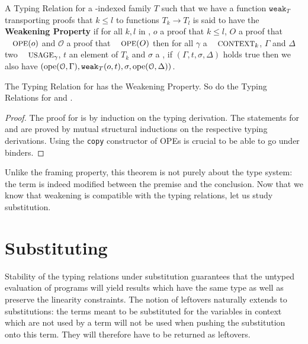 \begin{definition}A Typing Relation \TR{\cdot} for a \Nat{}-indexed family $T$
such that we have a function $\texttt{weak}_T$ transporting proofs that
\ensuremath{k \leq l} to functions \ensuremath{T_k \rightarrow T_l} is said to have the \textbf{Weakening Property}
if for all $k, l$ in \Nat{}, $o$ a proof that \ensuremath{k \leq l}, $O$ a proof that
$\OPE{}(o)$ and $\ensuremath{\mathcal{O}}$ a proof that $\OPE{}(O)$ then for all \ensuremath{\gamma} a $\Context{k}$,
\ensuremath{\Gamma} and \ensuremath{\Delta} two $\Usages{\ensuremath{\gamma}}$, $t$ an element of $T_k$ and \ensuremath{\sigma} a \Type{}, if
$(\ensuremath{\Gamma}, t, \ensuremath{\sigma}, \ensuremath{\Delta})$ holds true then we also have
$(\text{ope}(\mathcal{O}, \Gamma), \texttt{weak}_T(o, t), \sigma, \text{ope}(\mathcal{O}, \Delta))$.
\end{definition}

\begin{theorem}The Typing Relation for \Var{} has the Weakening Property.
So do the Typing Relations for \Inferable{} and \Checkable{}.
\end{theorem}
\begin{proof}
The proof for \Var{} is by induction on the typing derivation. The
statements for \Inferable{} and \Checkable{} are proved by mutual
structural inductions on the respective typing derivations. Using the
\texttt{copy} constructor of OPEs is crucial to be able to go under
binders.
\end{proof}

Unlike the framing property, this theorem is not purely about the
type system: the term is indeed modified between the premise and
the conclusion. Now that we know that weakening is compatible with
the typing relations, let us study substitution.


\section{Substituting}\label{sec:substitution}

Stability of the typing relations under substitution guarantees
that the untyped evaluation of programs will yield results which have
the same type as well as preserve the linearity constraints.
The notion of leftovers naturally extends to substitutions: the
terms meant to be substituted for the variables in context which
are not used by a term will not be used when pushing the substitution
onto this term. They will therefore have to be returned as leftovers.

